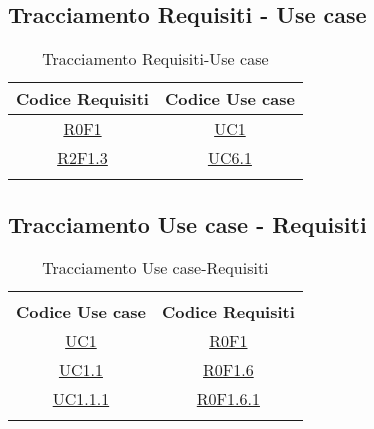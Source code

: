 \subsection{Tracciamento Requisiti - Use case}
\normalsize
\begin{longtable}{|c|c|}
	\hline
	\rowcolor{dosblue}
	\textbf{Codice Requisiti} & \textbf{Codice Use case} \\
	\hline
	\endhead
	\hyperlink{R0F1}{R0F1} & \hyperlink{UC1}{UC1}\\
	\hline
	\hyperlink{R2F1.3}{R2F1.3} & \hyperlink{UC6.1}{UC6.1}\\
	\hline
	\caption[Tracciamento Requisiti-Use case]{Tracciamento Requisiti-Use case}
	\label{tabella:requi-usecase}
\end{longtable}
\clearpage

\subsection{Tracciamento Use case - Requisiti}
\normalsize
\begin{longtable}{|c|c|}
	\hline\\
	\rowcolor{dosblue}
	\textbf{Codice Use case} & \textbf{Codice Requisiti} \\
	\hline
	\endhead
	\hyperlink{UC1}{UC1} & \hyperlink{R0F1}{R0F1}\\
	\hline
	\hyperlink{UC1.1}{UC1.1} & \hyperlink{R0F1.6}{R0F1.6}\\
	\hline
	\hyperlink{UC1.1.1}{UC1.1.1} & \hyperlink{R0F1.6.1}{R0F1.6.1}\\
	\hline
	\caption[Tracciamento Use case-Requisiti]{Tracciamento Use case-Requisiti}
	\label{tabella:requi-usecase}
\end{longtable}
\clearpage




